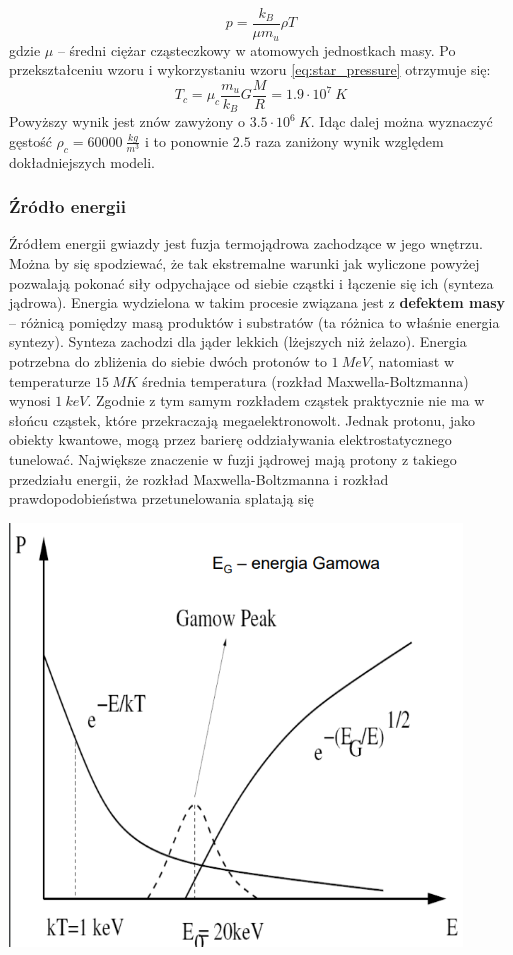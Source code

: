 \documentclass[../index.tex]{subfiles}
\begin{document}
                \begin{equation}
                    p = \frac{k_B}{\mu m_u} \rho T
                \end{equation}
                gdzie \(\mu\) \--- średni ciężar cząsteczkowy w atomowych jednostkach masy. Po przekształceniu wzoru i wykorzystaniu wzoru \ref{eq:star_pressure} otrzymuje się:
                \begin{equation}
                    T_c = \mu_c \frac{m_u}{k_B} G \frac{M}{R} = 1.9 \cdot 10^{7}\: K
                \end{equation}
                Powyższy wynik jest znów zawyżony o \(3.5 \cdot 10^{6}\: K\). Idąc dalej można wyznaczyć gęstość \(\rho_c = 60000\: \frac{kg}{m^3 }\) i to ponownie \(2.5\) raza zaniżony wynik względem dokładniejszych modeli.
            \subsubsection{Źródło energii}
                Źródłem energii gwiazdy jest fuzja termojądrowa zachodzące w jego wnętrzu. Można by się spodziewać, że tak ekstremalne warunki jak wyliczone powyżej pozwalają pokonać siły odpychające od siebie cząstki i łączenie się ich (synteza jądrowa). Energia wydzielona w takim procesie związana jest z \textbf{defektem masy} \--- różnicą pomiędzy masą produktów i substratów (ta różnica to właśnie energia syntezy). Synteza zachodzi dla jąder lekkich (lżejszych niż żelazo). Energia potrzebna do zbliżenia do siebie dwóch protonów to \(1\: MeV\), natomiast w temperaturze \(15\: MK\) średnia temperatura (rozkład Maxwella\--Boltzmanna) wynosi \(1\: keV\). Zgodnie z tym samym rozkładem cząstek praktycznie nie ma w słońcu cząstek, które przekraczają megaelektronowolt. Jednak protonu, jako obiekty kwantowe, mogą przez barierę oddziaływania elektrostatycznego tunelować. Największe znaczenie w fuzji jądrowej mają protony z takiego przedziału energii, że rozkład Maxwella\--Boltzmanna i rozkład prawdopodobieństwa przetunelowania splatają się
                \begin{center}
                    \includegraphics[width=12cm]{images/pikGamowa.png}  
                \end{center}
\end{document}
